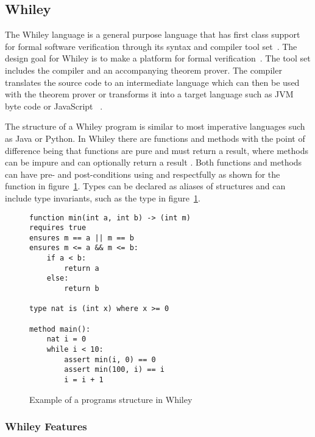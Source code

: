 \subsection{Whiley}

The Whiley language is a general purpose language that has first class
support for formal software verification through its syntax and compiler
tool set~\cite{whiley-origin}.
The design goal for Whiley is to make a platform for formal verification~\cite{whiley-origin}.
The tool set includes the compiler and an accompanying theorem prover.
The compiler translates the source code to an intermediate language which
can then be used with the theorem prover or transforms it into a target
language such as JVM byte code or JavaScript~\cite{whiley-design}
\cite{wyil}.

The structure of a Whiley program is similar to most imperative languages
such as Java or Python.
In Whiley there are functions and methods with the point of difference being
that functions are pure and must return a result,
where methods can be impure and can optionally return a result
\cite{whiley-spec}\cite{whiley-design}.
Both functions and methods can have pre- and post-conditions using
 and  respectfully as shown for the 
function in figure~\ref{lst:whiley-exp}.
Types can be declared as aliases of structures and can include type invariants,
such as the  type in figure~\ref{lst:whiley-exp}.

\begin{figure}[ht]
\begin{lstlisting}
function min(int a, int b) -> (int m)
requires true
ensures m == a || m == b
ensures m <= a && m <= b:
    if a < b:
        return a
    else:
        return b

type nat is (int x) where x >= 0

method main():
    nat i = 0
    while i < 10:
        assert min(i, 0) == 0
        assert min(100, i) == i
        i = i + 1
\end{lstlisting}
\caption{Example of a programs structure in Whiley}
\label{lst:whiley-exp}
\end{figure}

\subsubsection{Whiley Features}

